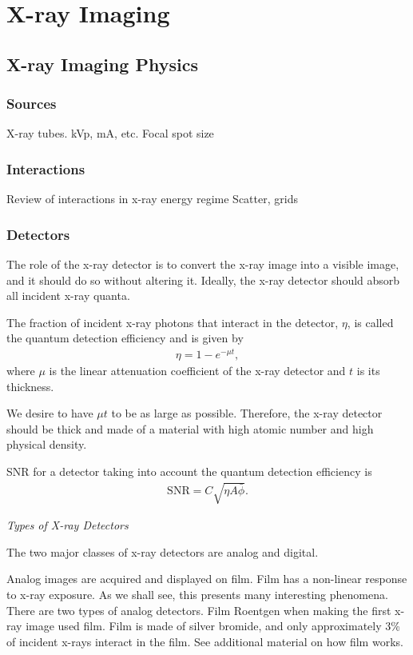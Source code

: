 \documentclass[mphy386-notes.tex]{subfiles}
\begin{document}
\section{X-ray Imaging}
\subsection{X-ray Imaging Physics}
\subsubsection{Sources}
X-ray tubes.
kVp, mA, etc.
Focal spot size

\subsubsection{Interactions}
Review of interactions in x-ray energy regime
Scatter, grids
\subsubsection{Detectors}
The role of the x-ray detector is to convert the x-ray image into a visible
image, and it should do so without altering it. Ideally, the x-ray detector
should absorb all incident x-ray quanta.

The fraction of incident x-ray photons that interact in the detector, $\eta$, is
called the quantum detection efficiency and is given by
\begin{align}
  \eta = 1 - e^{-\mu t},
\end{align}
where $\mu$ is the linear attenuation coefficient of the x-ray detector and $t$ is
its thickness.

We desire to have $\mu t$ to be as large as possible. Therefore, the x-ray
detector should be thick and made of a material with high atomic number and high
physical density.

SNR for a detector taking into account the quantum detection efficiency is
\begin{align}
  \text{SNR} = C\sqrt{\eta A\bar{\phi}}.
\end{align}


\emph{Types of X-ray Detectors}

The two major classes of x-ray detectors are analog and digital.

Analog images are acquired and displayed on film. Film has a non-linear response
to x-ray exposure. As we shall see, this presents many interesting
phenomena. There are two types of analog detectors. Film Roentgen when making
the first x-ray image used film. Film is made of silver bromide, and only
approximately 3\% of incident x-rays interact in the film. See additional
material on how film works.
\end{document}
